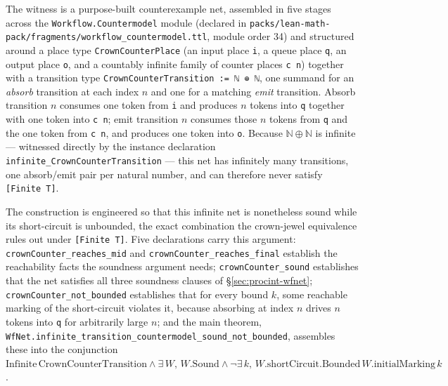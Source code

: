 The witness is a purpose-built counterexample net, assembled in five
stages across the \texttt{Workflow.Countermodel} module (declared in
\texttt{packs/lean-math-pack/fragments/workflow\_countermodel.ttl}, module
order 34) and structured around a place type
\texttt{CrownCounterPlace} (an input place \texttt{i}, a queue place
\texttt{q}, an output place \texttt{o}, and a countably infinite family of
counter places \texttt{c n}) together with a transition type
\texttt{CrownCounterTransition := ℕ ⊕ ℕ}, one summand for an
\emph{absorb} transition at each index \(n\) and one for a matching
\emph{emit} transition. Absorb transition \(n\) consumes one token from
\texttt{i} and produces \(n\) tokens into \texttt{q} together with one
token into \texttt{c n}; emit transition \(n\) consumes those \(n\) tokens
from \texttt{q} and the one token from \texttt{c n}, and produces one
token into \texttt{o}. Because \(\mathbb{N} \oplus \mathbb{N}\) is
infinite --- witnessed directly by the instance declaration
\texttt{infinite\_CrownCounterTransition} --- this net has infinitely many
transitions, one absorb/emit pair per natural number, and can therefore
never satisfy \texttt{[Finite T]}.

The construction is engineered so that this infinite net is nonetheless
sound while its short-circuit is unbounded, the exact combination the
crown-jewel equivalence rules out under \texttt{[Finite T]}. Five
declarations carry this argument: \texttt{crownCounter\_reaches\_mid} and
\texttt{crownCounter\_reaches\_final} establish the reachability facts the
soundness argument needs; \texttt{crownCounter\_sound} establishes that
the net satisfies all three soundness clauses of
\S\ref{sec:procint-wfnet}; \texttt{crownCounter\_not\_bounded} establishes
that for every bound \(k\), some reachable marking of the short-circuit
violates it, because absorbing at index \(n\) drives \(n\) tokens into
\texttt{q} for arbitrarily large \(n\); and the main theorem,
\texttt{WfNet.infinite\_transition\_countermodel\_sound\_not\_bounded},
assembles these into the conjunction \(\mathrm{Infinite}\,
\text{CrownCounterTransition} \land \exists\, W,\, W.\mathrm{Sound}
\land \lnot \exists\, k,\, W.\mathrm{shortCircuit}.\mathrm{Bounded}\,
W.\mathrm{initialMarking}\,k\).

